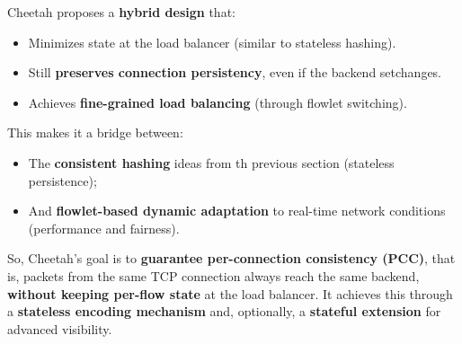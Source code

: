 \highspace
Cheetah proposes a \textbf{hybrid design} that:
\begin{itemize}
    \item Minimizes state at the load balancer (similar to stateless hashing).
    \item Still \textbf{preserves connection persistency}, even if the backend set\break changes.
    \item Achieves \textbf{fine-grained load balancing} (through flowlet switching).
\end{itemize}
This makes it a bridge between:
\begin{itemize}
    \item The \textbf{consistent hashing} ideas from th previous section (stateless persistence);
    \item And \textbf{flowlet-based dynamic adaptation} to real-time network conditions (performance and fairness).
\end{itemize}
So, Cheetah's goal is to \textbf{guarantee per-connection consistency (PCC)}, that is, packets from the same TCP connection always reach the same backend, \textbf{without keeping per-flow state} at the load balancer. It achieves this through a \textbf{stateless encoding mechanism} and, optionally, a \textbf{stateful extension} for advanced visibility.

